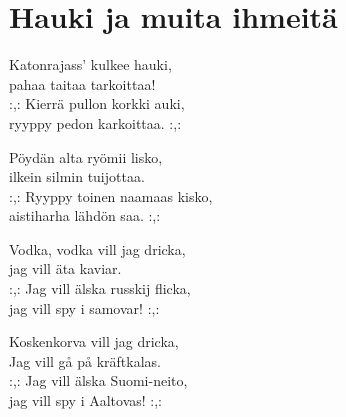 \section{Hauki ja muita ihmeitä}

Katonrajass’ kulkee hauki,\\
pahaa taitaa tarkoittaa!\\
:,: Kierrä pullon korkki auki,\\
ryyppy pedon karkoittaa. :,:

Pöydän alta ryömii lisko,\\
ilkein silmin tuijottaa.\\
:,: Ryyppy toinen naamaas kisko,\\
aistiharha lähdön saa. :,:

Vodka, vodka vill jag dricka,\\
jag vill äta kaviar.\\
:,: Jag vill älska russkij flicka,\\
jag vill spy i samovar! :,:

Koskenkorva vill jag dricka,\\
Jag vill gå på kräftkalas.\\
:,: Jag vill älska Suomi-neito,\\
jag vill spy i Aaltovas! :,: